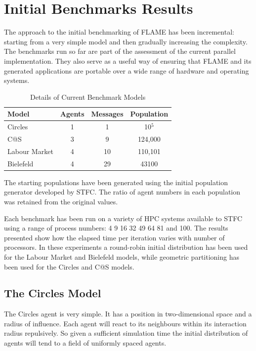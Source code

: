 \appendix
\section{Initial Benchmarks Results}
The approach to the initial benchmarking of FLAME has been incremental: starting from a very simple model and then gradually increasing the complexity. The benchmarks run so far are part of the assessment of the current parallel implementation. They also serve as a useful way of ensuring that FLAME and its generated applications are portable over a wide range of hardware and operating systems. 

\begin{table}[ht]
 \centering
  \begin{tabular}{l|ccc}
  Model     & Agents & Messages & Population   \\\hline
   Circles     &   1    &   1      &  10$^5$    \\
   C@S       &   3    &   9      &  124,000 \\
   Labour Market &   4    &   10     &  110,101 \\ 
   Bielefeld     &   4    &   29     &  43100     \\\hline
   \end{tabular}
   \caption{Details of Current Benchmark Models}
 \end{table}

The starting populations have been generated using the initial population generator developed by STFC. The ratio of agent numbers in each population was retained from the original values.

Each benchmark has been run on a variety of HPC systems available to STFC using a range of process numbers: 4 9 16 32 49 64 81 and 100. The results presented show how the elapsed time per iteration varies with number of processors. In these experiments a round-robin initial distribution has been used for the Labour Market and Bielefeld models, while geometric partitioning has been used for the Circles and C@S models.

\subsection{The Circles Model}

The Circles agent is very simple. It has a position in two-dimensional space and a radius of influence. Each agent will react to its neighbours within its interaction radius repulsively. So given a sufficient simulation time the initial distribution of agents will tend to a field of uniformly spaced agents.

